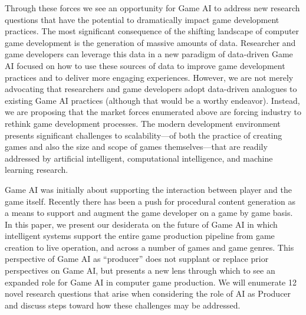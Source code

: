 \documentclass[conference]{IEEEtran}
\newcommand{\mytodo}[1]{\textbf{[[#1]]}}
\begin{document}
Through these forces we see an opportunity for Game AI to address new research questions that have the potential to dramatically impact game development practices.
%
The most significant consequence of the shifting landscape of computer game development is the generation of massive amounts of data. 
Researcher and game developers can leverage this data in a new paradigm of data-driven Game AI focused on how to use these sources of data to 
improve game development practices and to deliver more engaging experiences.
However, we are not merely advocating that researchers and game developers adopt data-driven analogues to existing Game AI practices (although that would be a worthy endeavor).
Instead, we are proposing that the market forces enumerated above are forcing industry to rethink game development processes.
The modern development environment presents significant challenges to scalability---of both the practice of creating games and also the size and scope of games themselves---that are readily addressed by artificial intelligent, computational intelligence, and machine learning research.

Game AI was initially about supporting the interaction between player and the game itself.
Recently there has been a push for procedural content generation as a means to support and augment the game developer on a game by game basis.
%
In this paper, we present our desiderata on the future of Game AI
in which intelligent systems support the entire game production pipeline from game creation to live operation, and across a number of games and game genres.
This perspective of Game AI as ``producer'' does not supplant or replace prior perspectives on Game AI, but presents a new lens through which to see an expanded role for Game AI in computer game production. 
We will enumerate 12 novel research questions that arise when considering the role of AI as Producer and discuss steps toward how these challenges may be addressed. 
\end{document}
